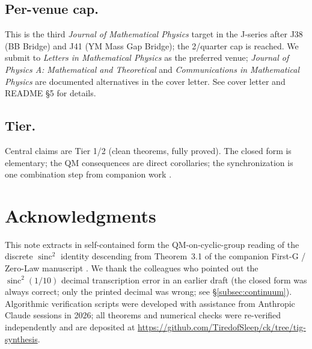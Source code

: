 \documentclass[11pt,reqno]{amsart}
\theoremstyle{plain}
\theoremstyle{definition}
\theoremstyle{remark}
\DeclareMathOperator{\sinc}{sinc}
\begin{document}
\subsection{Per-venue cap.}
This is the third \emph{Journal of Mathematical Physics} target in the J-series after
J38 (BB Bridge) and J41 (YM Mass Gap Bridge); the 2/quarter cap is reached. We submit
to \emph{Letters in Mathematical Physics} as the preferred venue; \emph{Journal of
Physics A: Mathematical and Theoretical} and \emph{Communications in Mathematical
Physics} are documented alternatives in the cover letter. See cover letter and README
\S5 for details.

\subsection{Tier.}
Central claims are Tier 1/2 (clean theorems, fully proved). The closed form is
elementary; the QM consequences are direct corollaries; the synchronization is one
combination step from companion work \cite{SandersGishSincZero}.

\section*{Acknowledgments}

This note extracts in self-contained form the QM-on-cyclic-group reading of the discrete
$\sinc^{2}$ identity descending from Theorem~3.1 of the companion First-G / Zero-Law
manuscript \cite{SandersGishSincZero}. We thank the colleagues who pointed out the
$\sinc^{2}(1/10)$ decimal transcription error in an earlier draft (the closed form was
always correct; only the printed decimal was wrong; see
\S\ref{subsec:continuum}). Algorithmic verification scripts were developed with
assistance from Anthropic Claude sessions in 2026; all theorems and numerical checks were
re-verified independently and are deposited at
\url{https://github.com/TiredofSleep/ck/tree/tig-synthesis}.
\end{document}

